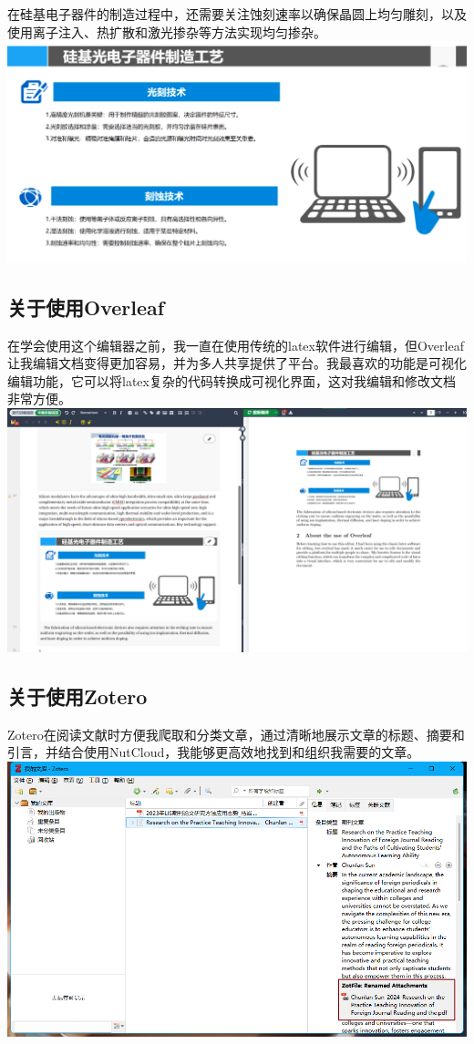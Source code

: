 \documentclass{article}
\begin{document}
\newpage
在硅基电子器件的制造过程中，还需要关注蚀刻速率以确保晶圆上均匀雕刻，以及使用离子注入、热扩散和激光掺杂等方法实现均匀掺杂。
\\
\noindent\includegraphics[width=\linewidth]{p3.png}
\subsection{关于使用Overleaf}
在学会使用这个编辑器之前，我一直在使用传统的latex软件进行编辑，但Overleaf让我编辑文档变得更加容易，并为多人共享提供了平台。我最喜欢的功能是可视化编辑功能，它可以将latex复杂的代码转换成可视化界面，这对我编辑和修改文档非常方便。
\\
\noindent\includegraphics[width=\linewidth]{p4.png}
\subsection{关于使用Zotero}
Zotero在阅读文献时方便我爬取和分类文章，通过清晰地展示文章的标题、摘要和引言，并结合使用NutCloud，我能够更高效地找到和组织我需要的文章。
\\
\noindent\includegraphics[width=\linewidth]{p5.png}
\end{document}

